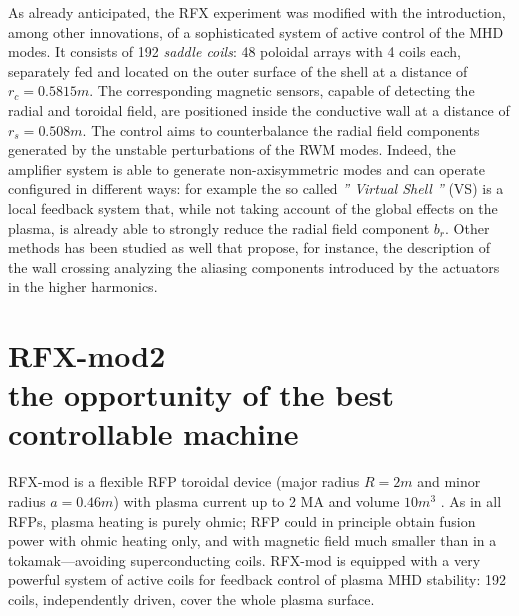 As already anticipated, the RFX experiment was modified with the introduction, among other innovations, of a sophisticated system of active control of the MHD modes. It consists of 192 \textit{saddle coils}: 48 poloidal arrays with 4 coils each, separately fed and located on the outer surface of the shell at a distance of $r_c = 0.5815m$. The corresponding magnetic sensors, capable of detecting the radial and toroidal field, are positioned inside the conductive wall at a distance of $r_s = 0.508m$. The control aims to counterbalance the radial field components generated by the unstable perturbations of the RWM modes. Indeed, the amplifier system is able to generate non-axisymmetric modes and can operate configured in different ways: for example the so called \emph{'' Virtual Shell ''} (VS) is a local feedback system that, while not taking account of the global effects on the plasma, is already able to strongly reduce the radial field component $b_r$\cite{pizz78}\cite{pizz79}. Other methods has been studied as well that propose, for instance, the description of the wall crossing analyzing the aliasing components introduced by the actuators in the higher harmonics\cite{pizz81}.




\section{RFX-mod2 \\ \small{the opportunity of the best controllable machine}}
\cite{SONATO2003161}
\cite{doi:10.1063/1.4806765}
\cite{martin_RFX_overview}


RFX-mod is a flexible \ac{RFP} toroidal device (major radius $R=2 m$ and minor radius $a=0.46 m$) with plasma current up to 2 MA \cite{2MA_RFX_Current} and volume $10 m^3$ \cite{SONATO200597}. As in all RFPs, plasma heating is purely ohmic; \acl{RFP} could in principle obtain fusion power with ohmic heating only, and with magnetic field much smaller than in a tokamak—avoiding superconducting coils. RFX-mod is equipped with a very powerful system of active coils for feedback control of plasma MHD stability: 192 coils, independently driven, cover the whole plasma surface.

